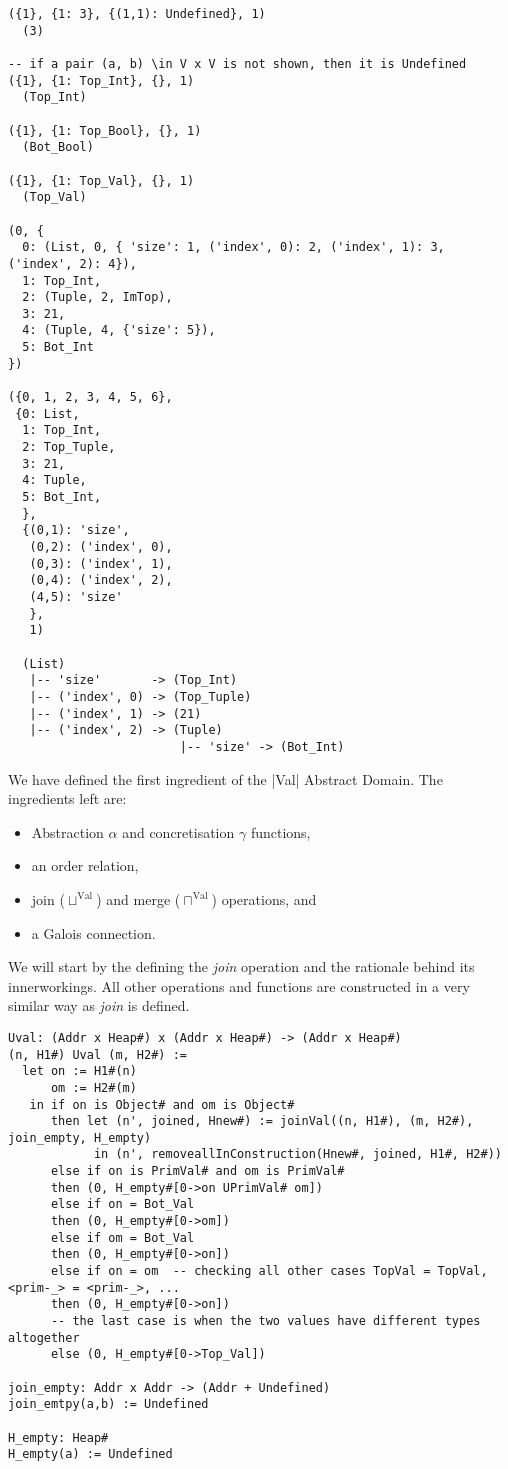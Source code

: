 \begin{verbatim}
({1}, {1: 3}, {(1,1): Undefined}, 1)
  (3)

-- if a pair (a, b) \in V x V is not shown, then it is Undefined
({1}, {1: Top_Int}, {}, 1)
  (Top_Int)

({1}, {1: Top_Bool}, {}, 1)
  (Bot_Bool)

({1}, {1: Top_Val}, {}, 1)
  (Top_Val)

(0, {
  0: (List, 0, { 'size': 1, ('index', 0): 2, ('index', 1): 3, ('index', 2): 4}),
  1: Top_Int,
  2: (Tuple, 2, ImTop),
  3: 21,
  4: (Tuple, 4, {'size': 5}),
  5: Bot_Int
})

({0, 1, 2, 3, 4, 5, 6},
 {0: List,
  1: Top_Int,
  2: Top_Tuple,
  3: 21,
  4: Tuple,
  5: Bot_Int,
  },
  {(0,1): 'size',
   (0,2): ('index', 0),
   (0,3): ('index', 1),
   (0,4): ('index', 2),
   (4,5): 'size'
   },
   1)

  (List)
   |-- 'size'       -> (Top_Int)
   |-- ('index', 0) -> (Top_Tuple)
   |-- ('index', 1) -> (21)
   |-- ('index', 2) -> (Tuple)
                        |-- 'size' -> (Bot_Int)
\end{verbatim}

We have defined the first ingredient of the \pycode|Val| Abstract
Domain. The ingredients left are:

\begin{itemize}
\tightlist
\item
  Abstraction \(\alpha{}\) and concretisation \(\gamma{}\) functions,
\item
  an order relation,
\item
  join (\(\sqcup^{\text{Val}}\)) and merge (\(\sqcap^{\text{Val}}\))
  operations, and
\item
  a Galois connection.
\end{itemize}

{}

We will start by the defining the \emph{join} operation and the
rationale behind its innerworkings. All other operations and functions
are constructed in a very similar way as \emph{join} is defined.

\begin{verbatim}
Uval: (Addr x Heap#) x (Addr x Heap#) -> (Addr x Heap#)
(n, H1#) Uval (m, H2#) :=
  let on := H1#(n)
      om := H2#(m)
   in if on is Object# and om is Object#
      then let (n', joined, Hnew#) := joinVal((n, H1#), (m, H2#), join_empty, H_empty)
            in (n', removeallInConstruction(Hnew#, joined, H1#, H2#))
      else if on is PrimVal# and om is PrimVal#
      then (0, H_empty#[0->on UPrimVal# om])
      else if on = Bot_Val
      then (0, H_empty#[0->om])
      else if om = Bot_Val
      then (0, H_empty#[0->on])
      else if on = om  -- checking all other cases TopVal = TopVal, <prim-_> = <prim-_>, ...
      then (0, H_empty#[0->on])
      -- the last case is when the two values have different types altogether
      else (0, H_empty#[0->Top_Val])

join_empty: Addr x Addr -> (Addr + Undefined)
join_emtpy(a,b) := Undefined

H_empty: Heap#
H_empty(a) := Undefined
\end{verbatim}

